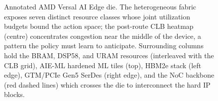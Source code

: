 \documentclass[journal,onecolumn=false]{IEEEtran}
\begin{document}
\begin{figure}[t]
\caption{Annotated AMD Versal AI Edge die. The heterogeneous fabric exposes seven distinct resource classes whose joint utilization budgets bound the action space; the post-route CLB heatmap (centre) concentrates congestion near the middle of the device, a pattern the policy must learn to anticipate. Surrounding columns hold the BRAM, DSP58, and URAM resources (interleaved with the CLB grid), AIE-ML hardened ML tiles (top), HBM2e stack (left edge), GTM/PCIe Gen5 SerDes (right edge), and the NoC backbone (red dashed lines) which crosses the die to interconnect the hard IP blocks.}
\label{fig:fpgaanatomy}
\end{figure}
\end{document}

